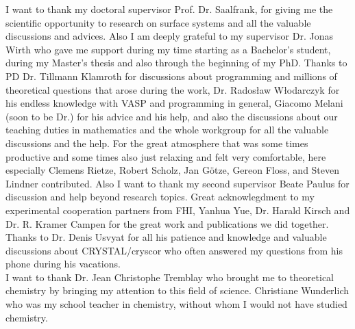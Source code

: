 \documentclass[11pt,DIV=13,BCOR=5mm,a4paper,headinclude]{scrbook}
\begin{document}
\begingroup
\renewcommand{\cleardoublepage}{}
\clearpage
{}
\endgroup
I want to thank my doctoral supervisor Prof. Dr. Saalfrank, for giving me the scientific opportunity to research on surface systems and all the valuable discussions and advices.
Also I am deeply grateful to my supervisor Dr. Jonas Wirth who gave me support during my time starting as a Bachelor's student, during my Master's thesis and also through the beginning of my PhD.
Thanks to PD Dr. Tillmann Klamroth for discussions about programming and millions of theoretical questions that arose during the work, Dr. Rados\l{}aw W\l{}odarczyk for his endless knowledge with VASP and programming in general, Giacomo Melani (soon to be Dr.) for his advice and his help, and also the discussions about our teaching duties in mathematics and the whole workgroup for all the valuable discussions and the help.
For the great atmosphere that was some times productive and some times also just relaxing and felt very comfortable, here especially Clemens Rietze, Robert Scholz, Jan Götze, Gereon Floss, and Steven Lindner contributed.
Also I want to thank my second supervisor Beate Paulus for discussion and help beyond research topics.
Great acknowlegdment to my experimental cooperation partners from FHI, Yanhua Yue, Dr. Harald Kirsch and Dr. R. Kramer Campen for the great work and publications we did together.
Thanks to Dr. Denis Usvyat for all his patience and knowledge and valuable discussions about CRYSTAL/cryscor who often answered my questions from his phone during his vacations.\\
I want to thank Dr. Jean Christophe Tremblay who brought me to theoretical chemistry by bringing my attention to this field of science.
Christiane Wunderlich who was my school teacher in chemistry, without whom I would not have studied chemistry.

\end{document}
